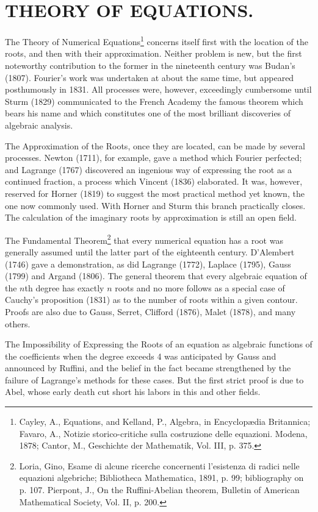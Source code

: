 \documentclass[oneside]{book}
\begin{document}
{\chapter{THEORY OF EQUATIONS.}

The Theory of Numerical Equations\footnote{Cayley, A., Equations,
and Kelland, P., Algebra, in Encyclop\ae{}dia Britannica; Favaro, A.,
Notizie storico-critiche sulla costruzione delle equazioni. Modena,
1878; Cantor, M., Geschichte der Mathematik, Vol. III, p. 375.}
concerns itself first with the location of the roots, and then with
their approximation. Neither problem is new, but the first
noteworthy contribution to the former in the nineteenth century was
Budan's (1807). Fourier's work was undertaken at about the same
time, but appeared posthumously in 1831. All processes were,
however, exceedingly cumbersome until Sturm (1829) communicated to
the French Academy the famous theorem which bears his name and which
constitutes one of the most brilliant discoveries of algebraic
analysis.

The Approximation of the Roots, once they are located, can be made
by several processes. Newton (1711), for example, gave a method
which Fourier perfected; and Lagrange (1767) discovered an ingenious
way of expressing the root as a continued fraction, a process which
Vincent (1836) elaborated. It was, however, reserved for Horner
(1819) to suggest the most practical method yet known, the one now
commonly used. With Horner and Sturm this branch practically
closes. The calculation of the imaginary roots by approximation is
still an open field.

The Fundamental Theorem\footnote{Loria, Gino, Esame di alcune
ricerche concernenti l'esistenza di radici nelle equazioni
algebriche; Bibliotheca Mathematica, 1891, p. 99; bibliography on
p. 107. Pierpont, J., On the Ruffini-Abelian theorem, Bulletin of
American Mathematical Society, Vol. II, p. 200.} that every
numerical equation has a root was generally assumed until the latter
part of the eighteenth century. D'Alembert (1746) gave a
demonstration, as did Lagrange (1772), Laplace (1795), Gauss (1799)
and Argand (1806). The general theorem that every algebraic equation
of the $n$th degree has exactly $n$ roots and no more follows as a
special case of Cauchy's proposition (1831) as to the number of
roots within a given contour. Proofs are also due to Gauss, Serret,
Clifford (1876), Malet (1878), and many others.

The Impossibility of Expressing the Roots of an equation as
algebraic functions of the coefficients when the degree exceeds 4
was anticipated by Gauss and announced by Ruffini, and the belief in
the fact became strengthened by the failure of Lagrange's methods
for these cases. But the first strict proof is due to Abel, whose
early death cut short his labors in this and other fields.

}
\end{document}
